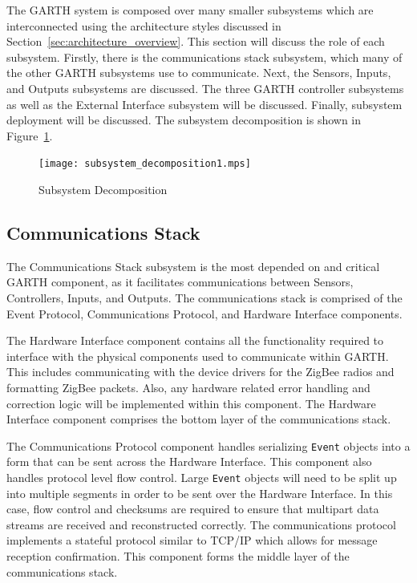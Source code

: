 \documentclass{report}
\begin{document}
The GARTH system is composed over many smaller subsystems which are
interconnected using the architecture styles discussed in
Section~\ref{sec:architecture_overview}. This section will discuss the
role of each subsystem. Firstly, there is the communications stack
subsystem, which many of the other GARTH subsystems use to
communicate. Next, the Sensors, Inputs, and Outputs subsystems are
discussed. The three GARTH controller subsystems as well as the
External Interface subsystem will be discussed. Finally, subsystem
deployment will be discussed. The subsystem decomposition is shown in
Figure~\ref{fig:subsystem_decomposition}.

\begin{figure}[hp]
    \centering
        \caption{Subsystem Decomposition}
        \scriptsize
        \setlength{\unitlength}{2.0em}
        \texttt{[image: subsystem\_decomposition1.mps]}
        \normalsize
    \label{fig:subsystem_decomposition}
\end{figure}

\subsection{Communications Stack}

The Communications Stack subsystem is the most depended on and critical
GARTH component, as it facilitates communications between Sensors,
Controllers, Inputs, and Outputs. The communications stack is
comprised of the Event Protocol, Communications Protocol, and Hardware
Interface components.

The Hardware Interface component contains all the
functionality required to interface with the physical components used
to communicate within GARTH. This includes communicating with the
device drivers for the ZigBee radios and formatting ZigBee packets.
Also, any hardware related error handling and correction logic will be
implemented within this component. The Hardware Interface component
comprises the bottom layer of the communications stack.

The Communications Protocol component handles serializing \texttt{Event}
objects into a form that can be sent across the Hardware
Interface. This component also handles protocol level flow
control. Large \texttt{Event} objects will need to be split up into multiple
segments in order to be sent over the Hardware Interface. In this
case, flow control and checksums are required to ensure that multipart
data streams are received and reconstructed correctly. The
communications protocol implements a stateful protocol similar to
TCP/IP which allows for message reception confirmation. This component
forms the middle layer of the communications stack.
\end{document}
